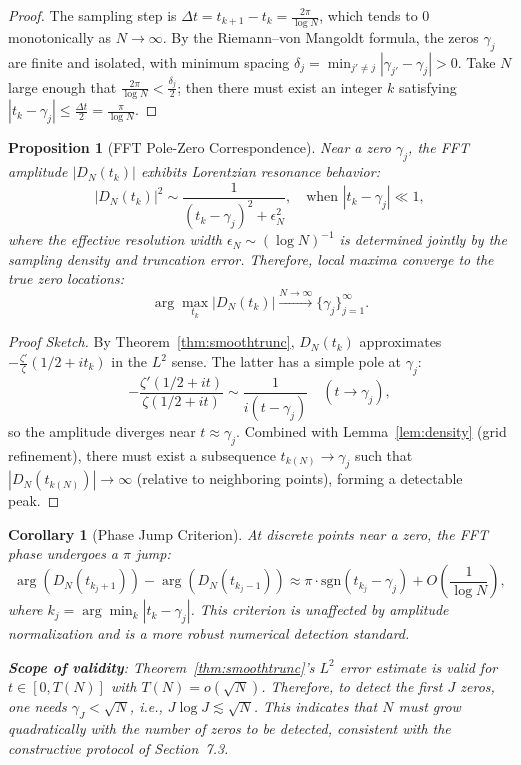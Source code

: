 \documentclass[12pt,a4paper]{amsart}
\theoremstyle{plain}
\newtheorem{proposition}[theorem]{Proposition}
\newtheorem{corollary}[theorem]{Corollary}
\theoremstyle{definition}
\theoremstyle{remark}
\begin{document}
\begin{proof}
The sampling step is $\Delta t = t_{k+1} - t_k = \frac{2\pi}{\log N}$, which tends to $0$ monotonically as $N\to\infty$. By the Riemann--von Mangoldt formula, the zeros $\gamma_j$ are finite and isolated, with minimum spacing $\delta_j = \min_{j'\neq j}|\gamma_{j'}-\gamma_j| > 0$. Take $N$ large enough that $\frac{2\pi}{\log N} < \frac{\delta_j}{2}$; then there must exist an integer $k$ satisfying $|t_k - \gamma_j| \leq \frac{\Delta t}{2} = \frac{\pi}{\log N}$.
\end{proof}

\begin{proposition}[FFT Pole-Zero Correspondence]\label{prop:polezero}
Near a zero $\gamma_j$, the FFT amplitude $|D_N(t_k)|$ exhibits Lorentzian resonance behavior:
\[
|D_N(t_k)|^2 \sim \frac{1}{(t_k - \gamma_j)^2 + \epsilon_N^2}, \quad \text{when } |t_k - \gamma_j| \ll 1,
\]
where the effective resolution width $\epsilon_N \sim (\log N)^{-1}$ is determined jointly by the sampling density and truncation error. Therefore, local maxima converge to the true zero locations:
\[
\arg\max_{t_k} |D_N(t_k)| \xrightarrow{N\to\infty} \{\gamma_j\}_{j=1}^\infty.
\]
\end{proposition}

\begin{proof}[Proof Sketch]
By Theorem~\ref{thm:smoothtrunc}, $D_N(t_k)$ approximates $-\frac{\zeta'}{\zeta}(1/2+it_k)$ in the $L^2$ sense. The latter has a simple pole at $\gamma_j$:
\[
-\frac{\zeta'(1/2+it)}{\zeta(1/2+it)} \sim \frac{1}{i(t-\gamma_j)}\quad (t\to\gamma_j),
\]
so the amplitude diverges near $t\approx\gamma_j$. Combined with Lemma~\ref{lem:density} (grid refinement), there must exist a subsequence $t_{k(N)}\to\gamma_j$ such that $|D_N(t_{k(N)})|\to\infty$ (relative to neighboring points), forming a detectable peak.
\end{proof}

\begin{corollary}[Phase Jump Criterion]\label{cor:phasejump}
At discrete points near a zero, the FFT phase undergoes a $\pi$ jump:
\[
\arg(D_N(t_{k_j+1})) - \arg(D_N(t_{k_j-1})) \approx \pi \cdot \mathrm{sgn}(t_{k_j} - \gamma_j) + O\left(\frac{1}{\log N}\right),
\]
where $k_j = \arg\min_k |t_k - \gamma_j|$. This criterion is unaffected by amplitude normalization and is a more robust numerical detection standard.

\textbf{Scope of validity}: Theorem~\ref{thm:smoothtrunc}'s $L^2$ error estimate is valid for $t \in [0, T(N)]$ with $T(N) = o(\sqrt{N})$. Therefore, to detect the first $J$ zeros, one needs $\gamma_J < \sqrt{N}$, i.e., $J \log J \lesssim \sqrt{N}$. This indicates that $N$ must grow quadratically with the number of zeros to be detected, consistent with the constructive protocol of Section~7.3.
\end{corollary}
\end{document}
